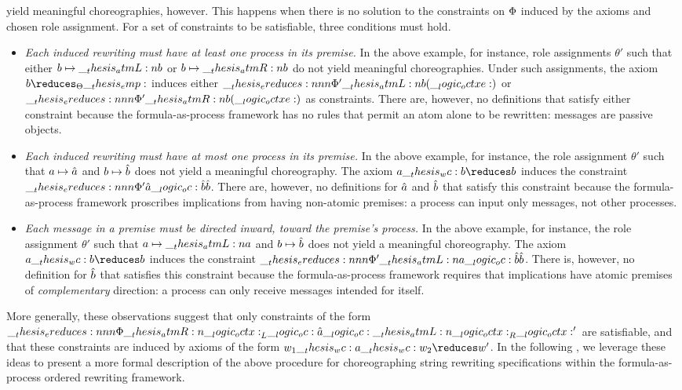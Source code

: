  yield meaningful choreographies, however.
This happens when there is no solution to the constraints on $\Phi$ induced by the axioms and chosen role assignment.
For a set of constraints to be satisfiable, three conditions must hold.
\begin{itemize}
\item
  \emph{Each induced rewriting must have at least one process in its premise.}
  In the above example, for instance, role assignments $\theta'$ such that either $b \mapsto \__thesis_atmL:n {b}$ or $b \mapsto \__thesis_atmR:n {b}$ do not yield meaningful choreographies.
  Under such assignments, the axiom $b \reduces_{\srsig} \emp$ induces either $\ereduces[\orsig']{\atmL{b}}{(\octxe)}$ or $\ereduces[\orsig']{\atmR{b}}{(\octxe)}$ as constraints.
  There are, however, no definitions that satisfy either constraint because the formula-as-process framework has no rules that permit an atom alone to be rewritten: messages are passive objects.

\item
  \emph{Each induced rewriting must have at most one process in its premise.}
  In the above example, for instance, the role assignment $\theta'$ such that $a \mapsto \hat{a}$ and $b \mapsto \hat{b}$ does not yield a meaningful choreography.
  The axiom $a \wc b \reduces b$ induces the constraint $\ereduces[\orsig']{\defp{a} \oc \defp{b}}{\defp{b}}$.
  There are, however, no definitions for $\hat{a}$ and $\hat{b}$ that satisfy this constraint because the formula-as-process framework proscribes implications from having non-atomic premises: a process can input only messages, not other processes.

\item
  \emph{Each message in a premise must be directed inward, toward the premise's process.}
  In the above example, for instance, the role assignment $\theta'$ such that $a \mapsto \__thesis_atmL:n {a}$ and $b \mapsto \hat{b}$ does not yield a meaningful choreography.
  The axiom $a \wc b \reduces b$ induces the constraint $\ereduces[\orsig']{\atmL{a} \oc \defp{b}}{\defp{b}}$.
  There is, however, no definition for $\hat{b}$ that satisfies this constraint because the formula-as-process framework requires that implications have atomic premises of \emph{complementary} direction: a process can only receive messages intended for itself.
\end{itemize}

More generally, these observations suggest that only constraints of the form $\ereduces[\orsig]{\atmR{\octx}_L \oc \defp{a} \oc \atmL{\octx}_R}{\octx'}$ are satisfiable, and that these constraints are induced by axioms of the form $w_1 \wc a \wc w_2 \reduces w'$.
In the following , we leverage these ideas to present a more formal description of the above procedure for choreographing string rewriting specifications within the formula-as-process ordered rewriting framework.

